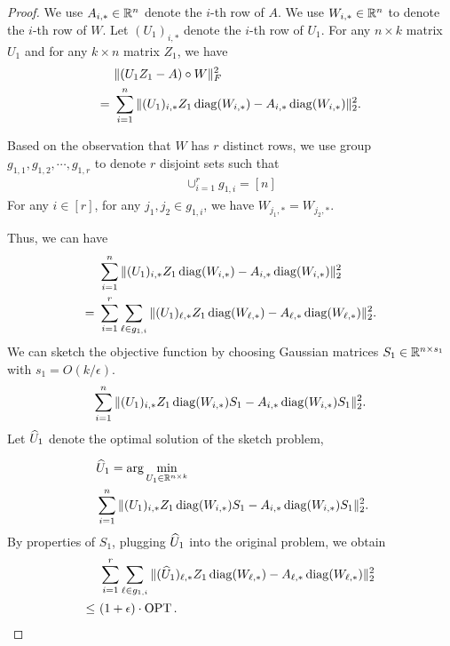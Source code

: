 \begin{proof}


We use $A_{i,*} \in \mathbb{R}^n$ denote the $i$-th row of $A$. We use $W_{i,*} \in \mathbb{R}^n$ to denote the $i$-th row of $W$. Let $(U_1)_{i,*}$ denote the $i$-th row of $U_1$.  
For any $n \times k$ matrix $U_1$ and for any $k \times n$ matrix $Z_1$, we have
\begin{align*}
 & ~ \| (U_1 Z_1 - A) \circ W \|_F^2 \\
 = & ~ \sum_{i=1}^n \| (U_1)_{i,*} Z_1 \operatorname{diag}( W_{i,*} ) - A_{i,*} \operatorname{diag}( W_{i,*} ) \|_2^2.
\end{align*}

Based on the observation that $W$ has $r$ distinct rows, we use group $g_{1,1}, g_{1,2}, \cdots , g_{1,r}$ to denote $r$ disjoint sets such that
\begin{align*}
    \cup_{i=1}^r g_{1,i} = [n]
\end{align*}
For any $i \in [r]$, for any $j_1, j_2 \in g_{1,i}$, we have $W_{j_1,*} = W_{j_2,*}$.


Thus, we can have 
\begin{align*}
    & ~ \sum_{i=1}^n \| (U_1)_{i,*} Z_1 \operatorname{diag}( W_{i,*} ) - A_{i,*} \operatorname{diag}( W_{i,*} ) \|_2^2 \\
    = & ~ \sum_{i=1}^r  \sum_{\ell \in g_{1,i}} \| (U_1)_{\ell,*} Z_1 \operatorname{diag}( W_{\ell,*} ) - A_{\ell,*} \operatorname{diag}( W_{\ell,*} ) \|_2^2  .
\end{align*}
We can sketch the objective function by choosing Gaussian matrices $S_1 \in \mathbb{R}^{n \times s_1}$ with $s_1 = O(k/\epsilon)$.
\begin{align*}
\sum_{i=1}^n \| (U_1)_{i,*} Z_1 \operatorname{diag}( W_{i,*} ) S_1 - A_{i,*} \operatorname{diag}( W_{i,*} ) S_1 \|_2^2 .
\end{align*}
Let $\widehat{U}_1$ denote the optimal solution of the sketch problem,

\begin{align*}
    & ~ \widehat{U}_1 =  \arg\min_{U_1 \in \mathbb{R}^{n \times k}} \\
    & ~ \sum_{i=1}^n \| (U_1)_{i,*} Z_1 \operatorname{diag}( W_{i,*} ) S_1 - A_{i,*} \operatorname{diag}( W_{i,*} ) S_1 \|_2^2 .
\end{align*}
By properties of $S_1$, plugging $\widehat{U}_1$ into the original problem, we obtain
\begin{align*}
& ~ \sum_{i=1}^r  \sum_{\ell \in g_{1,i}} \| (\widehat{U}_1)_{\ell,*} Z_1 \operatorname{diag}( W_{\ell,*} ) - A_{\ell,*} \operatorname{diag}( W_{\ell,*} ) \|_2^2  \\
\leq & ~  (1+\epsilon) \cdot \operatorname{OPT}.
\end{align*}


\end{proof}
